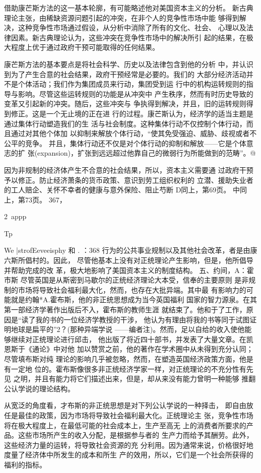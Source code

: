 借助康芒斯方法的这一基本轮廓，有可能略述他对美国资本主义的分析。
新古典理论主张，由稀缺资源问题引起的冲突，在非个人的竞争性市场中能
够得到解决，这种竞争性市场通过假设，从分析中消除了所有的文化、社会、
心理以及法律因素。新古典理论认为，这些冲突在竞争性市场中的解决所引
起的结果，在极大程度上优于通过政府干预可能取得的任何结果。

康芒斯方法的基本要点是将社会科学、历史以及法律包含到他的分析
中，并认识到为了产生合意的社会结果，政府干预经常是必要的。我们的
大部分经济活动并不是个体活动；我们作为集团成员来行动，集团受到运
行中的机构运转规则的指导与影响。尽管这些运转规则的功能是从冲突中
产生秩序，然而有时历史导致的变革又引起新的冲突。随后，这些冲突与
争执得到解决，并且，旧的运转规则得到修正。这是一个无止境的正在进
行的过程。康芒斯认为，经济学的适当主题是通过集体行动塑造我们的生
活与社会制度。这种集体行动不仅控制个体行动，而且通过对其他个体加
以抑制来解放个体行动，“使其免受强迫、威胁、歧视或者不公平的竞争。
并且，集体行动还不仅是对个体行动的抑制和解放——它是个体意志的扩
张(expansion)，扩张到远远超过他靠自己的微弱行为所能做到的范畴”。@

因为非规制的经济体产生不合意的社会结果，所以，资本主义需要通
过政府干预予以修正。防止经济萧条的货币政策、意识到劳工组织权利的
立潜、援助失业者的工人赔企、关怀不幸者的健康与意外保险、阻止芍断
D同上，第69页。
中同上，第73页。
367，

2\
appp

Tp

We
|strofEeveeisphy
和
.
：368
行为的公共事业规制以及其他社会改革，者是由康六斯所倡村的。因此，
尽管他基本上没有对正统理论产生影响，但是，他所倡导并帮助完成的改
革，极大地影响了美国资本主义的制度结构。
五、约间，A：霍市斯
尽管英国是从斯密到马歇尔的正统经济理论大本受，信奉的主要原则
是非规制的市场将导致社会福利最大化，然而，也存在大批异端。其中最
有影响力的可能就是约翰*A.霍布斯，他的非正统思想成为当今英国福利
国家的智力源泉。在其第一部经济学著作出版后不入，霍布斯的教师生涯
就结束了。他和于了工作，原因是“读了我的书的一位经济学教授的干涉，
他认为有理由将我的书等同于试图证明地球是扁平的”2？(那种异端学说
——编者注)。然而，足以自给的收入使他能够继续对正统理论进行邱击，
他出版了将近四十部书，并发表了大量文章。在凯恩斯于《通论》中对他
加以赞赏之前，他的著作在学术圈中从未得到充分认同；尽管填布斯对纯
理论的影响几乎被忽略，然而，在塑造英国经济政策方面，他是有一定地
位的。霍布斯像很多非正统经济学家一样，对正统理论的不充分性有先见
之明，并且有能力将它们描述出来，但是，却从来没有能力曾明一种能够
推翻公认学说的理论结构。

从宽泛的角度看，才布斯的非正统思想是对下列公认学说的一种择击，
即自由放任是最佳的政策，因为市场将导致社会福利最大化。正统理论主
张，竞争性市场将在极大程度上，在最低可能的社会成本上，生产至高无
上的消费者所要求的产品。这些市场所产生的收入分配，是根据参与者的
生产力而给予其酬劳。此外，这些经济力量的运转，将导致社会资源的充
分利用。因为通常来说，价格很好地度量了经济体中所发生的成本和所生
产的效用，所以，它们是一个社会所获得的福利的指标。

